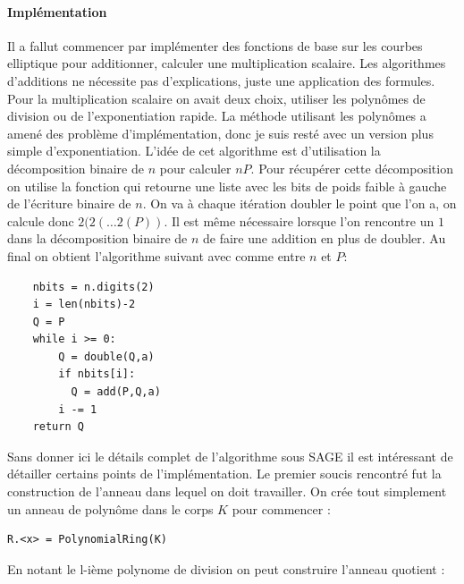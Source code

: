 \documentclass{article}
\begin{document}
\paragraph*{Implémentation}
Il a fallut commencer par implémenter des fonctions de base sur les courbes elliptique pour additionner, calculer une multiplication scalaire. Les algorithmes d'additions ne nécessite pas d'explications, juste une application des formules. Pour la multiplication scalaire on avait deux choix, utiliser les polynômes de division ou de l'exponentiation rapide. La méthode utilisant les polynômes a amené des problème d'implémentation, donc je suis resté avec un version plus simple d'exponentiation. L'idée de cet algorithme est d'utilisation la décomposition binaire de $n$ pour calculer $nP$. Pour récupérer cette décomposition on utilise la fonction  qui retourne une liste avec les bits de poids faible à gauche de l'écriture binaire de $n$. On va à chaque itération doubler le point que l'on a, on calcule donc $2(2(\ldots2(P))$. Il est même nécessaire lorsque l'on rencontre un $1$ dans la décomposition binaire de $n$ de faire une addition en plus de doubler. Au final on obtient l'algorithme suivant avec comme entre $n$ et $P$: 
\bigskip
\begin{lstlisting}
    nbits = n.digits(2)
    i = len(nbits)-2
    Q = P
    while i >= 0:
        Q = double(Q,a)
        if nbits[i]:
          Q = add(P,Q,a)
        i -= 1
    return Q
\end{lstlisting}
\bigskip

Sans donner ici le détails complet de l'algorithme sous SAGE il est intéressant de détailler certains points de l'implémentation. Le premier soucis rencontré fut la construction de l'anneau dans lequel on doit travailler. On crée tout simplement un anneau de polynôme dans le corps $K$ pour commencer :
\bigskip
\begin{lstlisting}
R.<x> = PolynomialRing(K)
\end{lstlisting}
\bigskip
En notant  le l-ième polynome de division on peut construire l'anneau quotient : 
\bigskip
\end{document}
